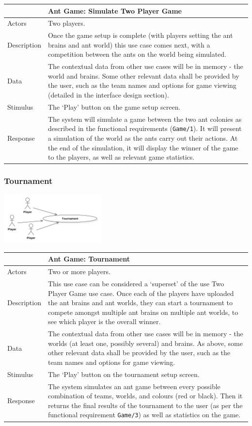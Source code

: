 \documentclass[11pt]{article}
\begin{document}
\begin{longtable}[c]{@{}p{}p{}@{}}
\toprule
& Ant Game: Simulate Two Player Game\tabularnewline
\midrule

Actors & Two players.\tabularnewline
Description & Once the game setup is complete (with players setting the
ant brains and ant world) this use case comes next, with a competition
between the ants on the world being simulated.\tabularnewline
Data & The contextual data from other use cases will be in memory - the
world and brains. Some other relevant data shall be provided by the
user, such as the team names and options for game viewing (detailed in
the interface design section).\tabularnewline
Stimulus & The `Play' button on the game setup screen.\tabularnewline
Response & The system will simulate a game between the two ant colonies
as described in the functional requirements (\texttt{Game/1}). It will
present a simulation of the world as the ants carry out their actions.
At the end of the simulation, it will display the winner of the game to
the players, as well as relevant game statistics.\tabularnewline
\bottomrule
\end{longtable}

\subsubsection{Tournament}\label{tournament}

\begin{center}
\includegraphics[width=0.4\textwidth]{high-level-diagrams/use-case-5-tournament.png}
\end{center}

\begin{longtable}[c]{@{}p{}p{}@{}}
\toprule
& Ant Game: Tournament\tabularnewline
\midrule

Actors & Two or more players.\tabularnewline
Description & This use case can be considered a `superset' of the use
Two Player Game use case. Once each of the players have uploaded the ant
brains and ant worlds, they can start a tournament to compete amongst
multiple ant brains on multiple ant worlds, to see which player is the
overall winner.\tabularnewline
Data & The contextual data from other use cases will be in memory - the
worlds (at least one, possibly several) and brains. As above, some other
relevant data shall be provided by the user, such as the team names and
options for game viewing.\tabularnewline
Stimulus & The `Play' button on the tournament setup
screen.\tabularnewline
Response & The system simulates an ant game between every possible
combination of teams, worlds, and colours (red or black). Then it
returns the final results of the tournament to the user (as per the
functional requirement \texttt{Game/3}) as well as statistics on the
game.\tabularnewline
\bottomrule
\end{longtable}
\end{document}
